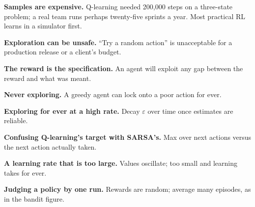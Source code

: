 \begin{alertbox}
\begin{tight}
  \item \textbf{Samples are expensive.} Q-learning needed 200{,}000 steps on a
        three-state problem; a real team runs perhaps twenty-five sprints a year.
        Most practical RL learns in a simulator first.
  \item \textbf{Exploration can be unsafe.} ``Try a random action'' is unacceptable
        for a production release or a client's budget.
  \item \textbf{The reward is the specification.} An agent will exploit any gap
        between the reward and what was meant.
\end{tight}
\end{alertbox}

\begin{pitfall}
\begin{tight}
  \item \textbf{Never exploring.} A greedy agent can lock onto a poor action for
        ever.
  \item \textbf{Exploring for ever at a high rate.} Decay $\varepsilon$ over time once
        estimates are reliable.
  \item \textbf{Confusing Q-learning's target with SARSA's.} Max over next actions
        versus the next action actually taken.
  \item \textbf{A learning rate that is too large.} Values oscillate; too small and
        learning takes for ever.
  \item \textbf{Judging a policy by one run.} Rewards are random; average many
        episodes, as in the bandit figure.
\end{tight}
\end{pitfall}

